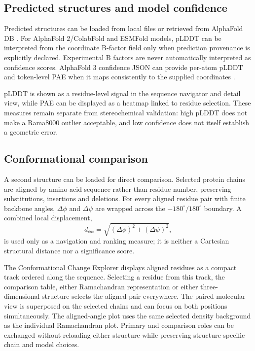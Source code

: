 \documentclass[11pt]{article}
\newcommand{\degree}{^\circ}
\begin{document}
\subsection{Predicted structures and model confidence}

Predicted structures can be loaded from local files or retrieved from AlphaFold DB \citep{Varadi2024}. For AlphaFold 2/ColabFold and ESMFold models, pLDDT can be interpreted from the coordinate B-factor field only when prediction provenance is explicitly declared. Experimental B factors are never automatically interpreted as confidence scores. AlphaFold 3 confidence JSON can provide per-atom pLDDT and token-level PAE when it maps consistently to the supplied coordinates \citep{Abramson2024}.

pLDDT is shown as a residue-level signal in the sequence navigator and detail view, while PAE can be displayed as a heatmap linked to residue selection. These measures remain separate from stereochemical validation: high pLDDT does not make a Rama8000 outlier acceptable, and low confidence does not itself establish a geometric error.

\subsection{Conformational comparison}

A second structure can be loaded for direct comparison. Selected protein chains are aligned by amino-acid sequence rather than residue number, preserving substitutions, insertions and deletions. For every aligned residue pair with finite backbone angles, $\Delta\phi$ and $\Delta\psi$ are wrapped across the $-180\degree/180\degree$ boundary. A combined local displacement,
\[
d_{\phi\psi}=\sqrt{(\Delta\phi)^2+(\Delta\psi)^2},
\]
is used only as a navigation and ranking measure; it is neither a Cartesian structural distance nor a significance score.

The Conformational Change Explorer displays aligned residues as a compact track ordered along the sequence. Selecting a residue from this track, the comparison table, either Ramachandran representation or either three-dimensional structure selects the aligned pair everywhere. The paired molecular view is superposed on the selected chains and can focus on both positions simultaneously. The aligned-angle plot uses the same selected density background as the individual Ramachandran plot. Primary and comparison roles can be exchanged without reloading either structure while preserving structure-specific chain and model choices.
\end{document}
